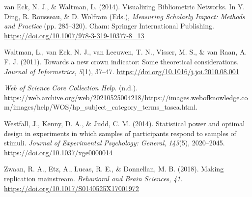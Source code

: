 \documentclass[
  man,floatsintext]{apa6}
\newlength{\cslhangindent}
\newlength{\cslentryspacingunit} %
\newenvironment{CSLReferences}[2] %
 {%
  \setlength{\parindent}{0pt}
  \ifodd #1
  \let\oldpar\par
  \def\par{\hangindent=\cslhangindent\oldpar}
  \fi
  \setlength{\parskip}{#2\cslentryspacingunit}
 }%
 {}
\begin{document}
\begin{CSLReferences}{1}{0}
\leavevmode{}%
van Eck, N. J., \& Waltman, L. (2014). Visualizing {Bibliometric Networks}. In Y. Ding, R. Rousseau, \& D. Wolfram (Eds.), \emph{Measuring {Scholarly Impact}: {Methods} and {Practice}} (pp. 285--320). {Cham}: {Springer International Publishing}. \url{https://doi.org/10.1007/978-3-319-10377-8_13}

\leavevmode{}%
Waltman, L., van Eck, N. J., van Leeuwen, T. N., Visser, M. S., \& van Raan, A. F. J. (2011). Towards a new crown indicator: {Some} theoretical considerations. \emph{Journal of Informetrics}, \emph{5}(1), 37--47. \url{https://doi.org/10.1016/j.joi.2010.08.001}

\leavevmode{}%
\emph{Web of {Science Core Collection Help}}. (n.d.). https://web.archive.org/web/20210525004218/https://images.webofknowledge.com/images/help/WOS/hp\_subject\_category\_terms\_tasca.html.

\leavevmode{}%
Westfall, J., Kenny, D. A., \& Judd, C. M. (2014). Statistical power and optimal design in experiments in which samples of participants respond to samples of stimuli. \emph{Journal of Experimental Psychology: General}, \emph{143}(5), 2020--2045. \url{https://doi.org/10.1037/xge0000014}

\leavevmode{}%
Zwaan, R. A., Etz, A., Lucas, R. E., \& Donnellan, M. B. (2018). Making replication mainstream. \emph{Behavioral and Brain Sciences}, \emph{41}. \url{https://doi.org/10.1017/S0140525X17001972}

\end{CSLReferences}
\end{document}
